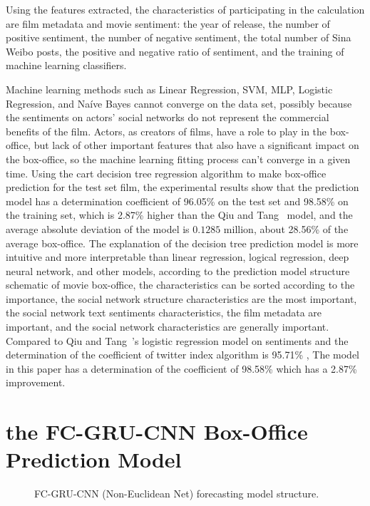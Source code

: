 \documentclass[review]{cvpr}
\begin{document}
Using the features extracted, the characteristics of participating in the calculation are film metadata and movie sentiment:
the year of release, the number of positive sentiment, the number of negative sentiment, the total number of Sina Weibo posts,
the positive and negative ratio of sentiment, and the training of machine learning classifiers.

Machine learning methods such as Linear Regression, SVM, MLP, Logistic Regression, and Na{\'i}ve Bayes cannot converge on the data set,
possibly because the sentiments on actors' social networks do not represent the commercial benefits of the film.
Actors, as creators of films, have a role to play in the box-office, but lack of other important features that also have a significant impact on the box-office,
so the machine learning fitting process can't converge in a given time.
Using the cart decision tree regression algorithm to make box-office prediction for the test set film,
the experimental results show that the prediction model has a determination coefficient of 96.05\% on the test set and 98.58\% on the training set, which is 2.87\% higher than the Qiu and Tang~\cite{qiu2018microblog} model,
and the average absolute deviation of the model is $0.1285$ million, about 28.56\% of the average box-office.
The explanation of the decision tree prediction model is more intuitive and more interpretable than linear regression, logical regression, deep neural network, and other models,
according to the prediction model structure schematic of movie box-office,
the characteristics can be sorted according to the importance, the social network structure characteristics are the most important,
the social network text sentiments characteristics, the film metadata are important, and the social network characteristics are generally important.
Compared to Qiu and Tang~\cite{qiu2018microblog}'s logistic regression model on sentiments and the determination of the coefficient of twitter index algorithm is 95.71\% ,
The model in this paper has a determination of the coefficient of 98.58\% which has a 2.87\% improvement.

\section{the FC-GRU-CNN Box-Office Prediction Model}


\begin{figure*}
\begin{center}
\end{center}
   \caption{FC-GRU-CNN (Non-Euclidean Net) forecasting model structure.}
\label{fig:short}
\end{figure*}
\end{document}
